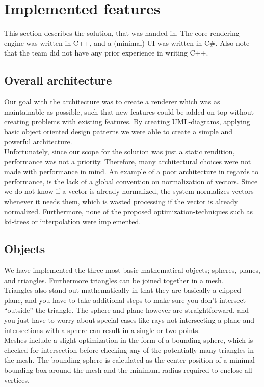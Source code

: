 \section{Implemented features}
This section describes the solution, that was handed in. The core rendering engine was written in C++, and a (minimal) UI was written in C\#. Also note that the team did not have any prior experience in writing C++.

\subsection{Overall architecture}
Our goal with the architecture was to create a renderer which was as maintainable as possible, such that new features could be added on top without creating problems with existing features. By creating UML-diagrams, applying basic object oriented design patterns we were able to create a simple and powerful architecture. \\

Unfortunately, since our scope for the solution was just a static rendition, performance was not a priority. Therefore, many architectural choices were not made with performance in mind. An example of a poor architecture in regards to performance, is the lack of a global convention on normalization of vectors. Since we do not know if a vector is already normalized, the system normalizes vectors whenever it needs them, which is wasted processing if the vector is already normalized. Furthermore, none of the proposed optimization-techniques such as kd-trees or interpolation were implemented.

\subsection{Objects}
We have implemented the three most basic mathematical objects; spheres, planes, and triangles. Furthermore triangles can be joined together in a mesh.\\
Triangles also stand out mathematically in that they are basically a clipped plane, and you have to take additional steps to make sure you don’t intersect “outside” the triangle. The sphere and plane however are straightforward, and you just have to worry about special cases like rays not intersecting a plane and intersections with a sphere can result in a single or two points.\\

Meshes include a slight optimization in the form of a bounding sphere, which is checked for intersection before checking any of the potentially many triangles in the mesh. The bounding sphere is calculated as the center position of a minimal bounding box around the mesh and the minimum radius required to enclose all vertices. \\

